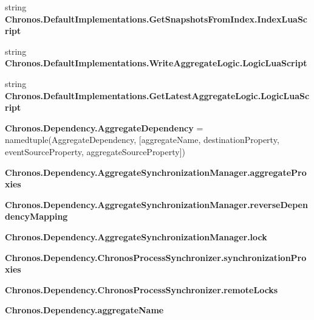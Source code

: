 \begin{DoxyCompactItemize}
\item 
string {\bfseries Chronos.\+Default\+Implementations.\+Get\+Snapshots\+From\+Index.\+Index\+Lua\+Script}
\item 
string {\bfseries Chronos.\+Default\+Implementations.\+Write\+Aggregate\+Logic.\+Logic\+Lua\+Script}
\item 
string {\bfseries Chronos.\+Default\+Implementations.\+Get\+Latest\+Aggregate\+Logic.\+Logic\+Lua\+Script}
\item 
{\bfseries Chronos.\+Dependency.\+Aggregate\+Dependency} = namedtuple(\textquotesingle{}Aggregate\+Dependency\textquotesingle{}, \mbox{[}\textquotesingle{}aggregate\+Name\textquotesingle{}, \textquotesingle{}destination\+Property\textquotesingle{}, \textquotesingle{}event\+Source\+Property\textquotesingle{}, \textquotesingle{}aggregate\+Source\+Property\textquotesingle{}\mbox{]})\hypertarget{group__Chronos_ga6124237128c1510f17552f04f59567e1}{}\label{group__Chronos_ga6124237128c1510f17552f04f59567e1}

\item 
{\bfseries Chronos.\+Dependency.\+Aggregate\+Synchronization\+Manager.\+aggregate\+Proxies}\hypertarget{group__Chronos_ga0aafc7811106d2cdd079641d76d04f2d}{}\label{group__Chronos_ga0aafc7811106d2cdd079641d76d04f2d}

\item 
{\bfseries Chronos.\+Dependency.\+Aggregate\+Synchronization\+Manager.\+reverse\+Dependency\+Mapping}\hypertarget{group__Chronos_ga397bb07b53bd293dbbba2c985190988d}{}\label{group__Chronos_ga397bb07b53bd293dbbba2c985190988d}

\item 
{\bfseries Chronos.\+Dependency.\+Aggregate\+Synchronization\+Manager.\+lock}\hypertarget{group__Chronos_ga1ab04b3dda106dbde32089a0786526bf}{}\label{group__Chronos_ga1ab04b3dda106dbde32089a0786526bf}

\item 
{\bfseries Chronos.\+Dependency.\+Chronos\+Process\+Synchronizer.\+synchronization\+Proxies}\hypertarget{group__Chronos_ga3404461f7443c50fe108f3c1cef9ef74}{}\label{group__Chronos_ga3404461f7443c50fe108f3c1cef9ef74}

\item 
{\bfseries Chronos.\+Dependency.\+Chronos\+Process\+Synchronizer.\+remote\+Locks}\hypertarget{group__Chronos_ga9c5c9a8f12c06000b244a4bc741c3e8d}{}\label{group__Chronos_ga9c5c9a8f12c06000b244a4bc741c3e8d}

\item 
{\bfseries Chronos.\+Dependency.\+aggregate\+Name}\hypertarget{group__Chronos_ga91dd60c634686c80c1997ec7350bb28a}{}\label{group__Chronos_ga91dd60c634686c80c1997ec7350bb28a}


\end{DoxyCompactItemize}
